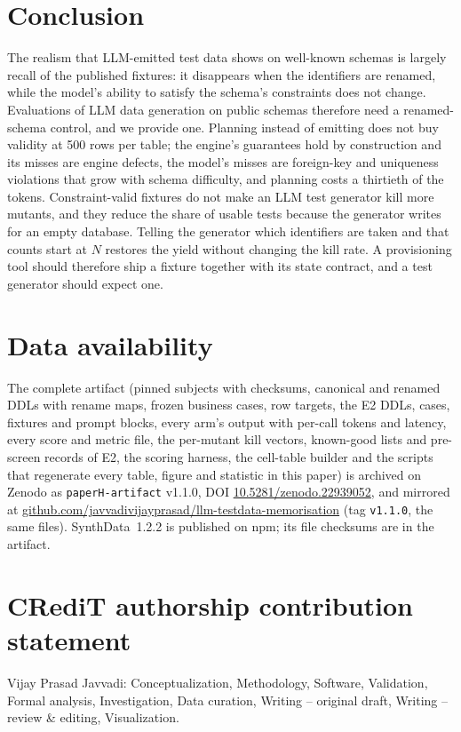 \documentclass[preprint,12pt]{elsarticle}
\begin{document}
\section{Conclusion}
\label{sec:conclusion}
The realism that LLM-emitted test data shows on well-known schemas is largely recall of the published fixtures: it disappears when the identifiers are renamed, while the model's ability to satisfy the schema's constraints does not change. Evaluations of LLM data generation on public schemas therefore need a renamed-schema control, and we provide one. Planning instead of emitting does not buy validity at 500 rows per table; the engine's guarantees hold by construction and its misses are engine defects, the model's misses are foreign-key and uniqueness violations that grow with schema difficulty, and planning costs a thirtieth of the tokens. Constraint-valid fixtures do not make an LLM test generator kill more mutants, and they reduce the share of usable tests because the generator writes for an empty database. Telling the generator which identifiers are taken and that counts start at $N$ restores the yield without changing the kill rate. A provisioning tool should therefore ship a fixture together with its state contract, and a test generator should expect one.

\section*{Data availability}
The complete artifact (pinned subjects with checksums, canonical and renamed DDLs with rename maps, frozen business cases, row targets, the E2 DDLs, cases, fixtures and prompt blocks, every arm's output with per-call tokens and latency, every score and metric file, the per-mutant kill vectors, known-good lists and pre-screen records of E2, the scoring harness, the cell-table builder and the scripts that regenerate every table, figure and statistic in this paper) is archived on Zenodo as \texttt{paperH-artifact} v1.1.0, DOI \href{https://doi.org/10.5281/zenodo.22939052}{10.5281/zenodo.22939052}, and mirrored at \href{https://github.com/javvadivijayprasad/llm-testdata-memorisation}{github.com/javvadivijayprasad/llm-testdata-memorisation} (tag \texttt{v1.1.0}, the same files). SynthData~1.2.2 is published on npm; its file checksums are in the artifact.

\section*{CRediT authorship contribution statement}
Vijay Prasad Javvadi: Conceptualization, Methodology, Software, Validation, Formal analysis, Investigation, Data curation, Writing -- original draft, Writing -- review \& editing, Visualization.
\end{document}

